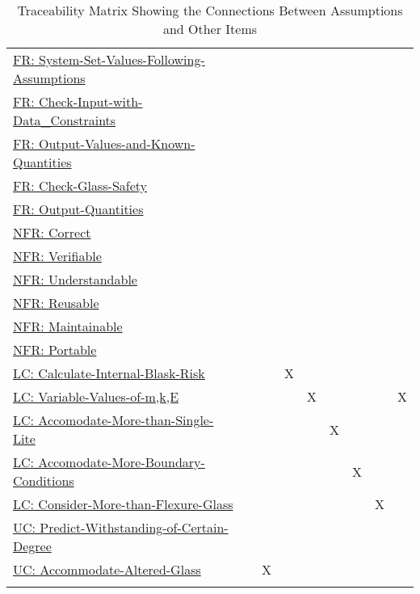\documentclass[12pt]{article}
\begin{document}
\begin{longtable}{l l l l l l l l l}
\\
\hyperref[sysSetValsFollowingAssumps]{FR: System-Set-Values-Following-Assumptions} &  &  &  &  &  &  &  & 
\\
\hyperref[checkInputWithDataCons]{FR: Check-Input-with-Data\_Constraints} &  &  &  &  &  &  &  & 
\\
\hyperref[outputValsAndKnownQuants]{FR: Output-Values-and-Known-Quantities} &  &  &  &  &  &  &  & 
\\
\hyperref[checkGlassSafety]{FR: Check-Glass-Safety} &  &  &  &  &  &  &  & 
\\
\hyperref[outputQuants]{FR: Output-Quantities} &  &  &  &  &  &  &  & 
\\
\hyperref[correct]{NFR: Correct} &  &  &  &  &  &  &  & 
\\
\hyperref[verifiable]{NFR: Verifiable} &  &  &  &  &  &  &  & 
\\
\hyperref[understandable]{NFR: Understandable} &  &  &  &  &  &  &  & 
\\
\hyperref[reusable]{NFR: Reusable} &  &  &  &  &  &  &  & 
\\
\hyperref[maintainable]{NFR: Maintainable} &  &  &  &  &  &  &  & 
\\
\hyperref[portable]{NFR: Portable} &  &  &  &  &  &  &  & 
\\
\hyperref[calcInternalBlastRisk]{LC: Calculate-Internal-Blask-Risk} &  &  & X &  &  &  &  & 
\\
\hyperref[varValsOfmkE]{LC: Variable-Values-of-m,k,E} &  &  &  & X &  &  &  & X
\\
\hyperref[accMoreThanSingleLite]{LC: Accomodate-More-than-Single-Lite} &  &  &  &  & X &  &  & 
\\
\hyperref[accMoreBoundaryConditions]{LC: Accomodate-More-Boundary-Conditions} &  &  &  &  &  & X &  & 
\\
\hyperref[considerMoreThanFlexGlass]{LC: Consider-More-than-Flexure-Glass} &  &  &  &  &  &  & X & 
\\
\hyperref[predictWithstandOfCertDeg]{UC: Predict-Withstanding-of-Certain-Degree} &  &  &  &  &  &  &  & 
\\
\hyperref[accAlteredGlass]{UC: Accommodate-Altered-Glass} &  & X &  &  &  &  &  & 
\\
\bottomrule
\caption{Traceability Matrix Showing the Connections Between Assumptions and Other Items}
\label{Table:TraceMatAvsAll}
\end{longtable}
\end{document}
